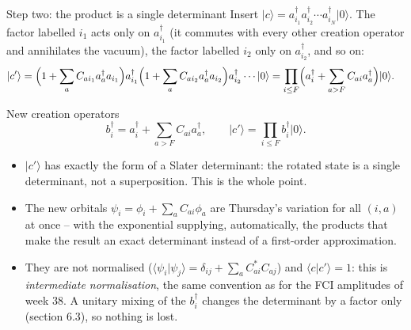 \documentclass[aspectratio=169,10pt]{beamer}
\newcommand{\ket}[1]{\vert #1\rangle}
\newcommand{\braket}[2]{\langle #1\vert #2\rangle}
\begin{document}
\begin{frame}{Step two: the product is a single determinant}
  \footnotesize
  Insert $\ket{c}=a_{i_1}^{\dagger}a_{i_2}^{\dagger}\cdots a_{i_N}^{\dagger}\ket{0}$. The factor labelled $i_1$ acts only on $a_{i_1}^{\dagger}$ (it commutes with every other creation operator and annihilates the vacuum), the factor labelled $i_2$ only on $a_{i_2}^{\dagger}$, and so on:
  \begin{align*}
    \ket{c'}&=\Bigl(1+\sum_{a}C_{ai_1}a_a^{\dagger}a_{i_1}\Bigr)a_{i_1}^{\dagger}\Bigl(1+\sum_aC_{ai_2}a_a^{\dagger}a_{i_2}\Bigr)a_{i_2}^{\dagger}\cdots\ket{0}
    =\prod_{i\le F}\Bigl(a_i^{\dagger}+\sum_{a>F}C_{ai}a_a^{\dagger}\Bigr)\ket{0}.
  \end{align*}
  \begin{block}{New creation operators}
    \[
      b_i^{\dagger}=a_i^{\dagger}+\sum_{a>F}C_{ai}a_a^{\dagger},\qquad\ket{c'}=\prod_{i\le F}b_i^{\dagger}\ket{0}.
    \]
  \end{block}
  \begin{itemize}
    \item $\ket{c'}$ has exactly the form of a Slater determinant: \alert{the rotated state is a single determinant, not a superposition}. This is the whole point.
    \item The new orbitals $\psi_i=\phi_i+\sum_aC_{ai}\phi_a$ are Thursday's variation for all $(i,a)$ at once -- with the exponential supplying, automatically, the products that make the result an exact determinant instead of a first-order approximation.
    \item They are not normalised ($\braket{\psi_i}{\psi_j}=\delta_{ij}+\sum_aC_{ai}^{*}C_{aj}$) and $\braket{c}{c'}=1$: this is \emph{intermediate normalisation}, the same convention as for the FCI amplitudes of week 38. A unitary mixing of the $b_i^{\dagger}$ changes the determinant by a factor only (section 6.3), so nothing is lost.
  \end{itemize}
\end{frame}
\end{document}
